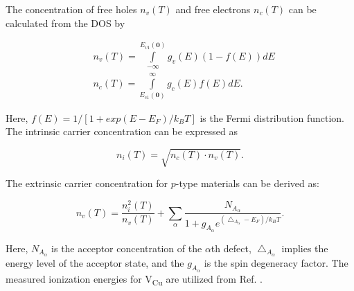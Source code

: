 \documentclass[a4paper, 12pt, titlepage,oneside,drop]{kthesis}
\begin{document}

The concentration of free holes $n_v(T)$ and free electrons $n_c(T)$ can be calculated from the DOS by

\begin{equation}
\begin{split}
& n_v(T) = \int \limits_{-\infty}^{E_{v1}(\textbf{0})} g_v(E)(1-f(E))dE\\
& n_c(T) = \int \limits_{E_{c1}(\textbf{0})}^{\infty} g_c(E)f(E)dE.
\end{split}
\end{equation}

Here, $f(E) = 1/[1+exp{(E-E_F)/k_BT}]$ is the Fermi distribution function. The intrinsic carrier concentration can be expressed as

\begin{equation}\label{cc}
 n_i(T) = \sqrt{n_c(T) \cdot n_v(T)}.
\end{equation}
 
The extrinsic carrier concentration for $p$-type materials can be derived as:

\begin{equation}\label{ecc}
n_v(T) = \frac{n_i^2(T)}{n_v(T)} + \sum \limits_{\alpha} \frac{N_{A_{\alpha}}} {1+g_{A_{\alpha}} e^{ (\bigtriangleup_{A_{\alpha}}-E_F)/k_BT }}. 
\end{equation}

Here, $N_{A_{\alpha}}$ is the acceptor concentration of the $\alpha$th defect, $\bigtriangleup_{A_{\alpha}}$ implies the energy level of the acceptor state, and the $g_{A_{\alpha}}$
 is the spin degeneracy factor. The measured ionization energies for V\textsubscript{Cu} are utilized from Ref. \cite{PIP:PIP936}.
\end{document}
